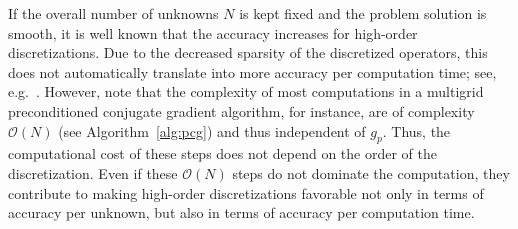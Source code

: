 \documentclass[smallcondensed,final]{svjour3}     %
\begin{document}


%
%


If the overall number of unknowns $N$ is kept fixed and the problem
solution is smooth, it is well known that the accuracy increases for
high-order discretizations. Due to the decreased sparsity of the
discretized operators, this does not automatically translate into more
accuracy per computation time; see, e.g.~\cite{Brown10}. However, note
that the complexity of most computations in a multigrid preconditioned
conjugate gradient algorithm, for instance, are of complexity
$\mathcal{O}(N)$ (see Algorithm~\ref{alg:pcg}) and thus independent of
$g_p$. Thus, the computational cost of these steps does not depend on
the order of the discretization. Even if these $\mathcal{O}(N)$ steps
do not dominate the computation, they contribute to making high-order
discretizations favorable not only in terms of accuracy per unknown,
but also in terms of accuracy per computation time.
\end{document}
